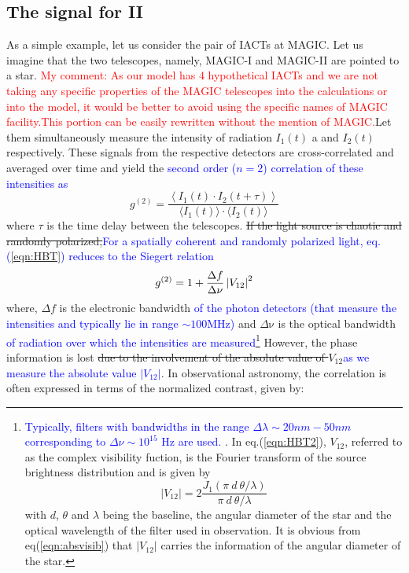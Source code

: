 \subsection{The signal for II}\label{sec:signal}
As a simple example, let us consider the pair of IACTs at MAGIC. Let us imagine that the two telescopes, namely, MAGIC-I and MAGIC-II are pointed to a star. \textcolor{red}{My comment: As our model has 4 hypothetical IACTs and we are not taking any specific properties of the MAGIC telescopes into the calculations or into the model, it would be better to avoid using the specific names of MAGIC facility.This portion can be easily rewritten without the mention of MAGIC.}Let them simultaneously measure the intensity of radiation $I_1(t)$ a  and $I_2(t)$ respectively. These signals from the respective detectors are cross-correlated and averaged over time and yield the \textcolor{blue}{second order ($n=2$) correlation of these intensities as}  \citep{acciari2020optical, dravins2013optical}
\begin{equation}
	g^{(2)}= \frac{\left\langle I_1(t) \cdot I_2(t + \tau) \right\rangle}{\langle I_1(t) \rangle \cdot \langle I_2(t) \rangle} 
	\label{eqn:HBT}
\end{equation}
where $\tau$ is the time delay between the telescopes. \st{If the light source is chaotic and randomly polarized,}\textcolor{blue}{For a spatially coherent and randomly polarized light, eq.(\ref{eqn:HBT}) reduces to the Siegert relation \citep{acciari2020optical}}
\begin{equation}
	g^{(2)} = 1 + \frac{\Delta f}{\Delta \nu} \left|V_{12}\right|^2
	\label{eqn:HBT2}
\end{equation}
where, $\Delta f$ is the electronic bandwidth \textcolor{blue}{of the photon detectors (that measure the intensities and typically lie in range $\sim 100 {\mathrm {MHz}}$)} and $\Delta {\mathrm {\nu}}$ is the optical bandwidth \textcolor{blue}{of radiation over which the intensities are measured}\footnote{\textcolor{blue}{Typically, filters with bandwidths in the range $\Delta \lambda \sim 20 nm - 50 nm$ corresponding to $\Delta \nu \sim 10^{15}$ Hz are used.} . In eq.(\ref{eqn:HBT2}), $V_{12}$, referred to as the complex visibility fuction, is the Fourier transform of the source brightness distribution and is given by
\begin{equation}
\vert V_{12} \vert = 2 \frac{J_1(\pi \ d \ {\theta}/{\lambda})}{\pi\  d \ {\theta}/{\lambda}}
\label{eqn:absvisib}
\end{equation}
with $d$, $\theta$ and $\lambda$ being the baseline, the angular diameter of the star and the optical wavelength of the filter used in observation.
It is obvious from eq(\ref{eqn:absvisib}) that $\vert V_{12} \vert$ carries the information of the angular diameter of the star.} However, the phase information is lost \st{due to the involvement of the absolute value of $V_{12}$}\textcolor{blue}{as we measure the absolute value $\vert V_{12} \vert$}. In observational astronomy, the correlation is often expressed in terms of the normalized contrast, given by:
